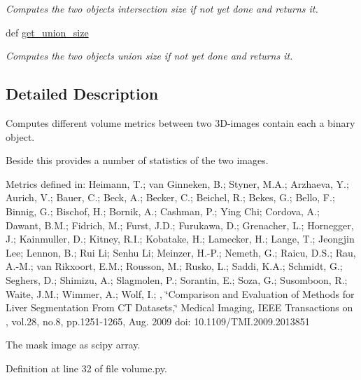 \begin{DoxyCompactItemize}
\begin{DoxyCompactList}\small\item\em Computes the two objects intersection size if not yet done and returns it. \end{DoxyCompactList}\item 
def \hyperlink{classmedpy_1_1metric_1_1volume_1_1Volume_afbd1496384ddb1233432dda30a961769}{get\_\-union\_\-size}
\begin{DoxyCompactList}\small\item\em Computes the two objects union size if not yet done and returns it. \end{DoxyCompactList}\end{DoxyCompactItemize}


\subsection{Detailed Description}
Computes different volume metrics between two 3D-\/images contain each a binary object. 

Beside this provides a number of statistics of the two images.

Metrics defined in: Heimann, T.; van Ginneken, B.; Styner, M.A.; Arzhaeva, Y.; Aurich, V.; Bauer, C.; Beck, A.; Becker, C.; Beichel, R.; Bekes, G.; Bello, F.; Binnig, G.; Bischof, H.; Bornik, A.; Cashman, P.; Ying Chi; Cordova, A.; Dawant, B.M.; Fidrich, M.; Furst, J.D.; Furukawa, D.; Grenacher, L.; Hornegger, J.; Kainmuller, D.; Kitney, R.I.; Kobatake, H.; Lamecker, H.; Lange, T.; Jeongjin Lee; Lennon, B.; Rui Li; Senhu Li; Meinzer, H.-\/P.; Nemeth, G.; Raicu, D.S.; Rau, A.-\/M.; van Rikxoort, E.M.; Rousson, M.; Rusko, L.; Saddi, K.A.; Schmidt, G.; Seghers, D.; Shimizu, A.; Slagmolen, P.; Sorantin, E.; Soza, G.; Susomboon, R.; Waite, J.M.; Wimmer, A.; Wolf, I.; , \char`\"{}Comparison and Evaluation of Methods for Liver Segmentation From CT Datasets,\char`\"{} Medical Imaging, IEEE Transactions on , vol.28, no.8, pp.1251-\/1265, Aug. 2009 doi: 10.1109/TMI.2009.2013851 \begin{DoxyVerb}The mask image as scipy array.\end{DoxyVerb}
 

Definition at line 32 of file volume.py.




